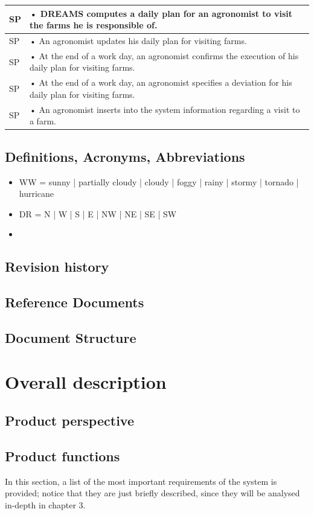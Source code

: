 \documentclass{article}
\begin{document}
\begin{longtable}[c]{|m{0.75cm}|m{11cm}|}
 \hline
 SP & •	DREAMS computes a daily plan  for an agronomist to visit the farms he is responsible of.\\
 \hline
 SP & •	An agronomist updates his daily plan for visiting farms.\\
 \hline
 SP & •	At the end of a work day, an agronomist confirms the execution of his daily plan for visiting farms.\\
 \hline
 SP & •	At the end of a work day, an agronomist specifies a deviation for his daily plan for visiting farms.\\
 \hline
 SP & •	An agronomist inserts into the system information regarding a visit to a farm.\\
 \hline
 \end{longtable}

\subsection{Definitions, Acronyms, Abbreviations}
\begin{itemize}
    \item WW = sunny | partially cloudy |  cloudy | foggy  |  rainy | stormy | tornado | hurricane
    \item DR = N | W | S | E | NW | NE | SE | SW 
    \item 
\end{itemize}
\subsection{Revision history}
\subsection{Reference Documents}
\subsection{Document Structure}

\section{Overall description}
\subsection{Product perspective}
\subsection{Product functions} \label{Product functions}
In this section, a list of the most important requirements of the system is provided; notice 
that they are just briefly described, since they will be analysed in-depth in chapter 3.
\end{document}
